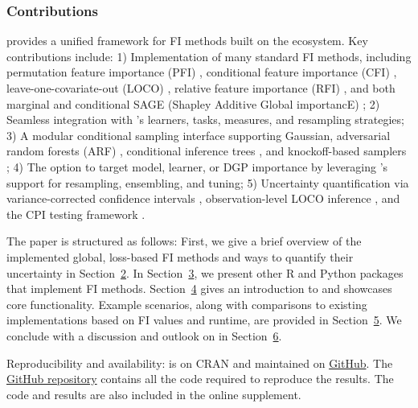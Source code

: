 \subsubsection{Contributions}\label{contributions}

 provides a unified framework for FI methods built on the  ecosystem.
Key contributions include:
1) Implementation of many standard FI methods, including permutation feature importance (PFI) \citep{breiman2001randomforests}, conditional feature importance (CFI) \citep{strobl2008conditionalvariablec, debeer2020conditionalpermutation}, leave-one-covariate-out (LOCO) \citep{lei2018distributionfreepredictivec}, relative feature importance (RFI) \citep{konig2021relativefeatured}, and both marginal and conditional SAGE (Shapley Additive Global importancE) \citep{covert2020understandingglobalb};
2) Seamless integration with 's learners, tasks, measures, and resampling strategies;
3) A modular conditional sampling interface supporting Gaussian, adversarial random forests (ARF) \citep{watson2023adversarialrandom}, conditional inference trees \citep{hothorn2006unbiasedrecursive}, and knockoff-based samplers \citep{candes2018panninggoldd};
4) The option to target model, learner, or DGP importance by leveraging 's support for resampling, ensembling, and tuning;
5) Uncertainty quantification via variance-corrected confidence intervals \citep{nadeau2003inferencegeneralization}, observation-level LOCO inference \citep{lei2018distributionfreepredictivec}, and the CPI testing framework \citep{watson2021testingconditional}.

The paper is structured as follows: First, we give a brief overview of the implemented global, loss-based FI methods and ways to quantify their uncertainty in Section~\hyperref[sec-fi-methods]{2}.
In Section~\hyperref[sec-related]{3}, we present other R and Python packages that implement FI methods.
Section~\hyperref[sec-intro-xplainfi]{4} gives an introduction to  and showcases core functionality.
Example scenarios, along with comparisons to existing implementations based on FI values and runtime, are provided in Section~\hyperref[sec-benchmark]{5}.
We conclude with a discussion and outlook on  in Section~\hyperref[sec-discussion]{6}.

Reproducibility and availability:  is on CRAN and maintained on \href{https://github.com/mlr-org/xplainfi}{GitHub}.
The \href{https://github.com/slds-lmu/paper_2025_xplainfi_benchmark}{GitHub repository} contains all the code required to reproduce the results. The code and results are also included in the online supplement.

